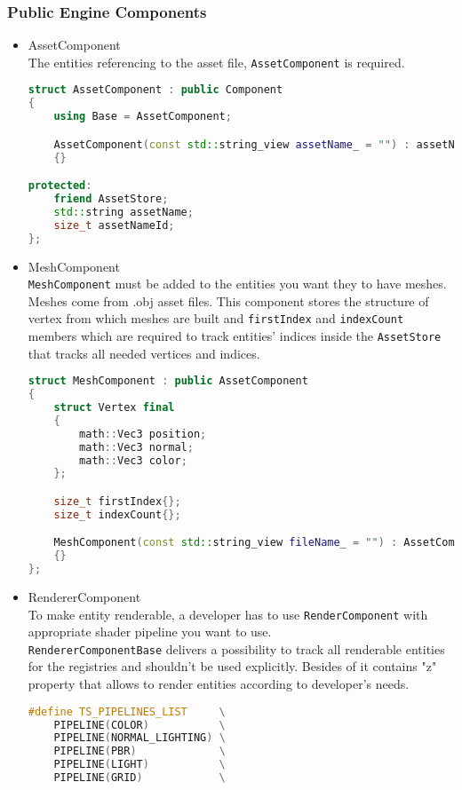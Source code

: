 \subsubsection{Public Engine Components}
\begin{itemize}
    \item AssetComponent\\
    The entities referencing to the asset file, \texttt{AssetComponent} is required.
\begin{lstlisting}[language=c++, caption= Asset Component struct(./engine/include/tsengine/ecs/components/asset\_component.h)]
struct AssetComponent : public Component
{
    using Base = AssetComponent;

    AssetComponent(const std::string_view assetName_ = "") : assetName{assetName_}, assetNameId{std::hash<std::string_view>{}(assetName_)}
    {}

protected:
    friend AssetStore;
    std::string assetName;
    size_t assetNameId;
};
\end{lstlisting}
    \item MeshComponent\\
    \texttt{MeshComponent} must be added to the entities you want they to have meshes.
    Meshes come from .obj asset files.
    This component stores the structure of vertex from which meshes are built and \texttt{firstIndex} and \texttt{indexCount} members which are required to track entities' indices inside the \texttt{AssetStore} that tracks all needed vertices and indices. 
\begin{lstlisting}[language=c++, caption= Mesh Component struct (./engine/include/tsengine/ecs/components/mesh\_component.h)]
struct MeshComponent : public AssetComponent
{
    struct Vertex final
    {
        math::Vec3 position;
        math::Vec3 normal;
        math::Vec3 color;
    };

    size_t firstIndex{};
    size_t indexCount{};

    MeshComponent(const std::string_view fileName_ = "") : AssetComponent{fileName_}
    {}
};
\end{lstlisting}
    \item RendererComponent\\
    \label{sec:render_component}
    To make entity renderable, a developer has to use \texttt{RenderComponent} with appropriate shader pipeline you want to use.\\
    \texttt{RendererComponentBase} delivers a possibility to track all renderable entities for the registries and shouldn't be used explicitly. Besides of it contains "z" property that allows to render entities according to developer's needs. 
\begin{lstlisting}[language=c++, caption=Renderer Component struct (./engine/include/tsengine/ecs/components/renderer\_component.h)]
#define TS_PIPELINES_LIST     \
    PIPELINE(COLOR)           \
    PIPELINE(NORMAL_LIGHTING) \
    PIPELINE(PBR)             \
    PIPELINE(LIGHT)           \
    PIPELINE(GRID)            \



\end{lstlisting}
\end{itemize}
